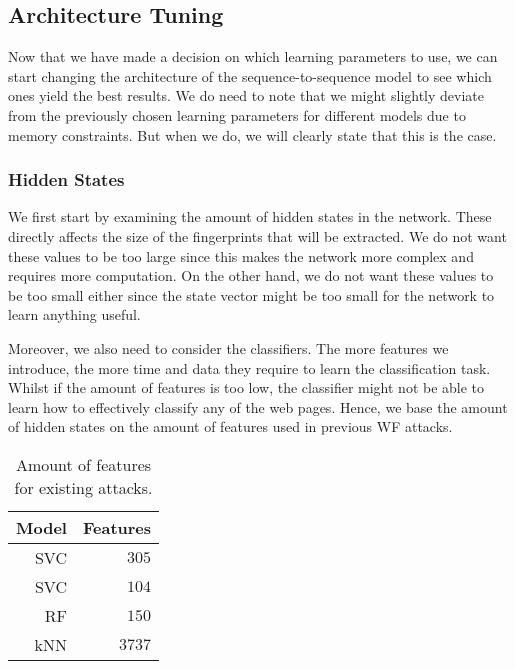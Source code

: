 \subsection{Architecture Tuning}

Now that we have made a decision on which learning parameters to use, we can start changing the architecture of the sequence-to-sequence model to see which ones yield the best results.
We do need to note that we might slightly deviate from the previously chosen learning parameters for different models due to memory constraints.
But when we do, we will clearly state that this is the case.

\subsubsection{Hidden States}

We first start by examining the amount of hidden states in the network.
These directly affects the size of the fingerprints that will be extracted.
We do not want these values to be too large since this makes the network more complex and requires more computation.
On the other hand, we do not want these values to be too small either since the state vector might be too small for the network to learn anything useful.

Moreover, we also need to consider the classifiers.
The more features we introduce, the more time and data they require to learn the classification task.
Whilst if the amount of features is too low, the classifier might not be able to learn how to effectively classify any of the web pages.
Hence, we base the amount of hidden states on the amount of features used in previous WF attacks.

\begin{table}[ht]
  \centering
  \begin{tabular}{ r r } \hline
    \multicolumn{1}{c}{\textbf{Model}} & \multicolumn{1}{c}{\textbf{Features}} \\ \hline
    SVC \cite{panchenko1} & $305$ \\
    SVC \cite{panchenko2} & $104$ \\
    RF \cite{kfingerprinting} & $150$ \\
    kNN \cite{wang_cai_johnson_nithyanand_goldberg_2014} & $3737$ \\
    \hline
  \end{tabular}
  \caption{Amount of features for existing attacks.}
  \label{table:feature-wf-attacks}
\end{table}

